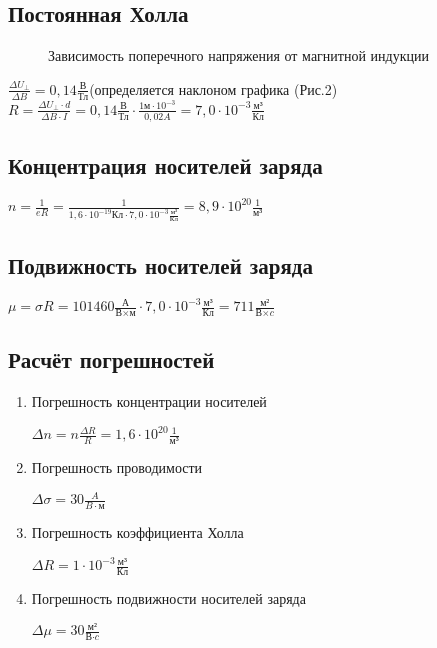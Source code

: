 \documentclass[12pt,letterpaper]{article}
\begin{document}
      \subsection{Постоянная Холла}\par

        \begin{figure}[h!]
            \caption{Зависимость поперечного напряжения от магнитной индукции}
            \label{fig:image}
        \end{figure}


         $\frac{\Delta U_{\bot}}{\Delta B}=0,14 \frac{\textit{В}}{\textit{Тл}}$(определяется наклоном графика (Рис.2)
         \newline
         $R=\frac{\Delta U_{\bot}\cdot d}{\Delta B\cdot I}=0,14\frac{\textit{В}}{\textit{Тл}}\cdot\frac{1\textit{м}\cdot 10^{-3}}{0,02\textit{A}} = 7,0\cdot10^{-3} \frac{\textit{м³}}{\textit{Кл}}$
      \newpage
      \subsection{Концентрация носителей заряда}\par
        $n=\frac{1}{eR}=\frac{1}{1,6\cdot 10^{-19}\textit{Кл}\cdot 7,0\cdot10^{-3}\frac{\textit{м³}}{\textit{Кл}}}=8,9\cdot 10^{20} \frac{1}{\textit{м³}}$
      \subsection{Подвижность носителей заряда}\newline
        $\mu = \sigma R=101460 \frac{\textit{А}}{\textit{В×м}}\cdot 7,0\cdot10^{-3}\frac{\textit{м³}}{\textit{Кл}}=711\frac{\textit{м²}}{\textit{В×c}}$
      \subsection {Расчёт погрешностей}
        \begin{enumerate}
            \item Погрешность концентрации носителей\par
            $\Delta n = n \frac {\Delta R}{R}=1,6\cdot 10^{20} \frac{1}{\textit{м³}}$
            \item Погрешность проводимости\par
            $\Delta \sigma = 30 \frac{A}{B\cdot \textit{м}}$
            \item Погрешность коэффициента Холла\par
            $\Delta R = 1\cdot10^{-3} \frac{\textit{м³}}{\textit{Кл}}$
            \item Погрешность подвижности носителей заряда\par
            $\Delta \mu = 30 \frac{\textit{м²}}{\textit{В} \cdot \textit {c}} $
        \end{enumerate}
\end{document}
